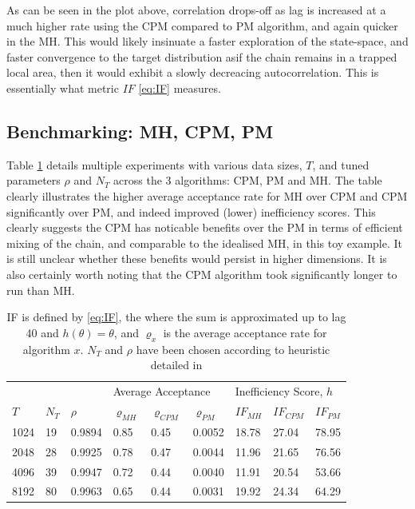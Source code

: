 \documentclass{article}
\begin{document}
As can be seen in the plot above, correlation drops-off as lag is increased at a much higher rate using the CPM compared to PM algorithm, and again quicker in the MH. This would likely insinuate a faster exploration of the state-space, and faster convergence to the target distribution asif the chain remains in a trapped local area, then it would exhibit a slowly decreacing autocorrelation. This is essentially what metric $IF$ \eqref{eq:IF} measures.

\subsection{Benchmarking: MH, CPM, PM}

Table \ref{tab:table} details multiple experiments with various data sizes, $T$, and tuned parameters $\rho$ and $N_T$ across the 3 algorithms: CPM, PM and MH. The table clearly illustrates the higher average acceptance rate for MH over CPM and CPM significantly over PM, and indeed improved (lower) inefficiency scores. This clearly suggests the CPM has noticable benefits over the PM in terms of efficient mixing of the chain, and comparable to the idealised MH, in this toy example. It is still unclear whether these benefits would persist in higher dimensions. It is also certainly worth noting that the CPM algorithm took significantly longer to run than MH.

\begin{table}[H]
\begin{tabular}{|l|ll|lll|lll|}
\hline
     & \multicolumn{2}{l|}{} & \multicolumn{3}{l|}{Average Acceptance}           & \multicolumn{3}{l|}{Inefficiency Score, $h$} \\
$T$  & $N_T$     & $\rho$    & $\varrho_{MH}$ & $\varrho_{CPM}$ & $\varrho_{PM}$ & $IF_{MH}$     & $IF_{CPM}$    & $IF_{PM}$    \\ \hline
1024 & 19        & 0.9894    & 0.85           & 0.45            & 0.0052         & 18.78         & 27.04         & 78.95        \\
2048 & 28        & 0.9925    & 0.78           & 0.47            & 0.0044         & 11.96         & 21.65         & 76.56        \\
4096 & 39        & 0.9947    & 0.72          & 0.44            & 0.0040         & 11.91         & 20.54         & 53.66        \\
8192 & 80        & 0.9963    & 0.65           & 0.44            & 0.0031         & 19.92         & 24.34         & 64.29        \\ \hline
\end{tabular}
\caption{IF is defined by \eqref{eq:IF}, the where the sum is approximated up to lag 40 and $h(\theta)=\theta$, and $\varrho_{x}$ is the average acceptance rate for algorithm $x$. $N_T$ and $\rho$ have been chosen according to heuristic detailed in \cite{cpmmDeligiannidis2015}}
\label{tab:table}
\end{table}
\end{document}
